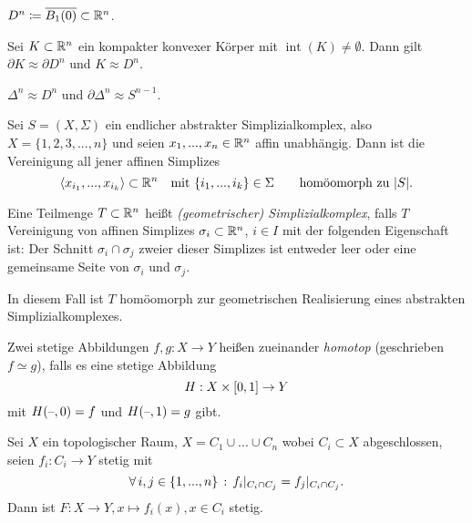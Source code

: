\documentclass{cheat-sheet}
\newcommand{\inte}{\mathop{\mathrm{int}}} %
\begin{document}
\begin{nota}
  $D^n \coloneqq \overline{B_1(0)} \subset \mathbb{R}^n$.
\end{nota}

\begin{prop}
  Sei $K \subset \mathbb{R}^n$ ein kompakter konvexer Körper mit $\inte(K) \not= \emptyset$. Dann gilt $\partial K \approx \partial D^n$ und $K \approx D^n$.
\end{prop}

\begin{kor}
  $\Delta^n \approx D^n$ und $\partial \Delta^n \approx S^{n-1}$.
\end{kor}

\begin{prop}
  Sei $S = (X, \Sigma)$ ein endlicher abstrakter Simplizialkomplex, also $X = \{ 1, 2, 3, ..., n \}$ und seien $x_1, ..., x_n \in \mathbb{R}^n$ affin unabhängig. Dann ist die Vereinigung all jener affinen Simplizes
  \[
    \langle x_{i_1}, ..., x_{i_k} \rangle \subset \mathbb{R}^n \quad
    \text{mit $\{ i_1, ..., i_k \} \in \Sigma$} \qquad
    \text{homöomorph zu $\lvert S\rvert$.}
  \]
\end{prop}

\begin{defn}
  Eine Teilmenge $T \subset \mathbb{R}^n$ heißt \emph{(geometrischer) Simplizialkomplex}, falls $T$ Vereinigung von affinen Simplizes $\sigma_i \subset \mathbb{R}^n$, $i \in I$ mit der folgenden Eigenschaft ist: Der Schnitt $\sigma_i \cap \sigma_j$ zweier dieser Simplizes ist entweder leer oder eine gemeinsame Seite von $\sigma_i$ und $\sigma_j$.
\end{defn}

\begin{bem}
  In diesem Fall ist $T$ homöomorph zur geometrischen Realisierung eines abstrakten Simplizialkomplexes.
\end{bem}


\begin{defn}
  Zwei stetige Abbildungen $f, g : X \to Y$ heißen zueinander \emph{homotop} (geschrieben $f \simeq g$), falls es eine stetige Abbildung
  \[ H : X \times \left[ 0, 1 \right] \to Y \]
  mit $H(\text{--}, 0) = f$ und $H(\text{--}, 1) = g$ gibt.
\end{defn}

\begin{lem}
  Sei $X$ ein topologischer Raum, $X = C_1 \cup ... \cup C_n$ wobei $C_i \subset X$ abgeschlossen, seien $f_i : C_i \to Y$ stetig mit
  \[ \forall \, {i, j \in \{ 1, ..., n \}} \,:\, f_i|_{C_i \cap C_j} = f_j|_{C_i \cap C_j}. \]
  Dann ist $F : X \to Y, x \mapsto f_i(x), x \in C_i$ stetig.
\end{lem}
\end{document}

